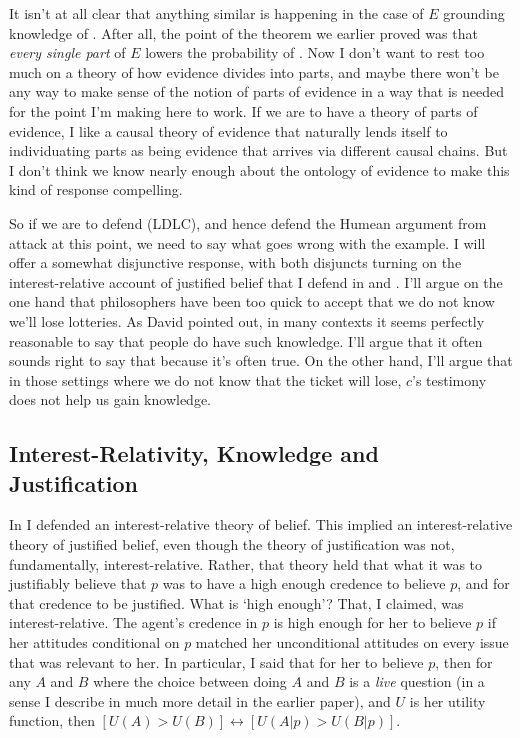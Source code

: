 It isn't at all clear that anything similar is happening in the case of $E$ grounding knowledge of \ECH. After all, the point of the theorem we earlier proved was that \textit{every single part} of $E$ lowers the probability of \ECH. Now I don't want to rest too much on a theory of how evidence divides into parts, and maybe there won't be any way to make sense of the notion of parts of evidence in a way that is needed for the point I'm making here to work. If we are to have a theory of parts of evidence, I like a causal theory of evidence that naturally lends itself to individuating parts as being evidence that arrives via different causal chains. But I don't think we know nearly enough about the ontology of evidence to make this kind of response compelling.

So if we are to defend (LDLC), and hence defend the Humean argument from attack at this point, we need to say what goes wrong with the example. I will offer a somewhat disjunctive response, with both disjuncts turning on the interest-relative account of justified belief that I defend in \citet{Weatherson2005-WEACWD} and \citet{Weatherson2011-WEAKBI}. I'll argue on the one hand that philosophers have been too quick to accept that we do not know we'll lose lotteries. As David \citet{Lewis1996b} pointed out, in many contexts it seems perfectly reasonable to say that people do have such knowledge. I'll argue that it often sounds right to say that because it's often true. On the other hand, I'll argue that in those settings where we do not know that the ticket will lose, $c$'s testimony does not help us gain knowledge.

\subsection{Interest-Relativity, Knowledge and Justification}
In \citet{Weatherson2005-WEACWD} I defended an interest-relative theory of belief. This implied an interest-relative theory of justified belief, even though the theory of justification was not, fundamentally, interest-relative. Rather, that theory held that what it was to justifiably believe that $p$ was to have a high enough credence to believe $p$, and for that credence to be justified. What is `high enough'? That, I claimed, was interest-relative. The agent's credence in $p$ is high enough for her to believe $p$ if her attitudes conditional on $p$ matched her unconditional attitudes on every issue that was relevant to her. In particular, I said that for her to believe $p$, then for any $A$ and $B$ where the choice between doing $A$ and $B$ is a \textit{live} question (in a sense I describe in much more detail in the earlier paper), and $U$ is her utility function, then $[U(A) > U(B)] \leftrightarrow [U(A | p) > U(B | p)]$.

